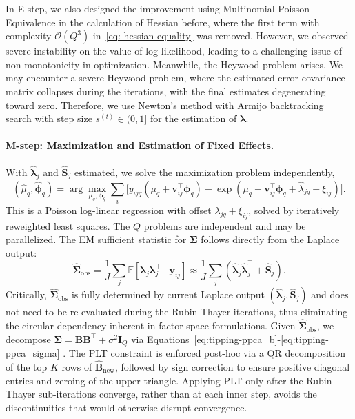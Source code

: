 In E-step, we also designed the improvement using Multinomial-Poisson Equivalence in the calculation of Hessian before, where the first term with complexity $\mathcal{O}\left(Q^{3}\right)$ in~\eqref{eq: hessian-equality} was removed.
However, we observed severe instability on the value of log-likelihood, leading to a challenging issue of non-monotonicity in optimization.
Meanwhile, the Heywood problem arises. We may encounter a severe Heywood problem, where the estimated error covariance matrix collapses during the iterations, with the final estimates degenerating toward zero. Therefore, we use Newton's method with Armijo backtracking search with step size $s^{(t)}\in (0,1]$ for the estimation of $\bm{\lambda}$. 

\paragraph*{M-step: Maximization and Estimation of Fixed Effects.}
With $\hat{\bm{\lambda}}_{j}$ and $\hat{\mathbf{S}}_{j}$ estimated, we solve the maximization problem independently, 
\begin{equation}
    (\hat{\mu}_{q}, \hat{\bm{\phi}}_{q})=\arg \max_{\mu_{q}, \bm{\phi}_{q}}\sum_{i}\bigl[y_{ijq}(\mu_{q}+\bm{v}_{ij}^{\top}\bm{\phi}_{q})-\exp (\mu_{q}+\bm{v}_{ij}^{\top}\bm{\phi}_{q}+\hat{\lambda}_{jq}+\xi_{ij})\bigr].
\end{equation}
This is a Poisson log-linear regression with offset $\lambda_{jq}+\xi_{ij}$, solved by iteratively reweighted least squares. The $Q$ problems are independent and may be parallelized. The EM sufficient statistic for $\bm{\Sigma}$ follows directly from the Laplace output:
\begin{equation}
    \hat{\bm{\Sigma}}_{\text{obs}}=\frac{1}{J}\sum_{j}\mathbb{E}[\bm{\lambda}_{j} \bm{\lambda}_{j}^{\top}\mid \bm{y}_{ij}]\approx \frac{1}{J}\sum_{j}(\hat{\bm{\lambda}}_{j} \hat{\bm{\lambda}}_{j}^{\top}+\hat{\mathbf{S}}_{j}).
    \label{eq:sigma-obs}
\end{equation}
Critically, $\hat{\bm{\Sigma}}_{\text{obs}}$ is fully determined by current Laplace output $(\hat{\bm{\lambda}}_{j}, \hat{\mathbf{S}}_{j})$ and does not need to be re-evaluated during the Rubin-Thayer iterations, thus eliminating the circular dependency inherent in factor-space formulations.
Given $\hat{\bm{\Sigma}}_{\text{obs}}$, we decompose $\bm{\Sigma}=\mathbf{BB}^{\top}+\sigma^2\mathbf{I}_{Q}$ via Equations~\eqref{eq:tipping-ppca_b}-\eqref{eq:tipping-ppca_sigma} \citep{Tipping1999}. The PLT constraint is enforced post-hoc via a QR decomposition of the top $K$ rows of $\hat{\mathbf{B}}_{\text{new}}$, followed by sign correction to ensure positive diagonal entries and zeroing of the upper triangle. Applying PLT only after the Rubin–Thayer sub-iterations converge, rather than at each inner step, avoids the discontinuities that would otherwise disrupt convergence.

